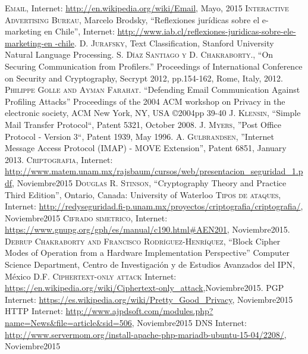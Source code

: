 \documentclass[12pt,oneside,onecolumn,openany]{report}
\begin{document}

\begin{thebibliography}{a}
   \textsc{Email}, Internet: \url{http://en.wikipedia.org/wiki/Email}, Mayo, 2015
   \textsc{Interactive Advertising Bureau}, Marcelo Brodsky, “Reflexiones jurídicas sobre el e-marketing en Chile”, Internet: \url{http://www.iab.cl/reflexiones-juridicas-sobre-ele-marketing-en -chile}.
   \textsc{D. Jurafsky}, Text Classification, Stanford University Natural Language Processing.
   \textsc{S. Díaz Santiago y D. Chakraborty.}, ``On Securing Communication from Profilers.” Proceedings of International Conference on Security and Cryptography, Secrypt 2012, pp.154-162, Rome, Italy, 2012.
   \textsc{Philippe  Golle and Ayman  Farahat}. ``Defending  Email  Communication  Against  Profiling  Attacks'' Proceedings  of  the  2004  ACM  workshop  on  Privacy  in  the  electronic  society, ACM  New  York,  NY, USA ©2004pp 39-40
   \textsc{J. Klensin}, ``Simple Mail Transfer Protocol``, Patent 5321, October 2008. 
   \textsc{J. Myers}, ''Post Office Protocol - Version 3``, Patent 1939, May 1996. 
   \textsc{A.  Gulbrandsen}, ''Internet  Message  Access  Protocol  (IMAP)  -  MOVE  Extension'',  Patent 6851, January 2013. 
   \textsc{Criptografia}, Internet: \url{http://www.matem.unam.mx/rajsbaum/cursos/web/presentacion_seguridad_1.pdf}, Noviembre2015
   \textsc{Douglas R. Stinson}, ``Cryptography Theory and Practice Third Edition'', Ontario, Canada: University of Waterloo
   \textsc{Tipos de ataques}, Internet: \url{http://redyseguridad.fi-p.unam.mx/proyectos/criptografia/criptografia/}, Noviembre2015
   \textsc{Cifrado simetrico}, Internet: \url{https://www.gnupg.org/gph/es/manual/c190.html#AEN201}, Noviembre2015.
   \textsc{Debrup Chakraborty and Francisco Rodríguez-Henríquez}, ``Block Cipher Modes of Operation from a Hardware Implementation Perspective'' Computer Science Department, Centro de Investigación y de Estudios Avanzados del IPN, México D.F. 
   \textsc{Ciphertext-only attack} Internet: \url{https://en.wikipedia.org/wiki/Ciphertext-only_attack},Noviembre2015.
   \textsc{PGP} Internet: \url{https://es.wikipedia.org/wiki/Pretty_Good_Privacy}, Noviembre2015
   \textsc{HTTP} Internet: \url{http://www.ajpdsoft.com/modules.php?name=News&file=article&sid=506}, Noviembre2015
   \textsc{DNS} Internet: \url{http://www.servermom.org/install-apache-php-mariadb-ubuntu-15-04/2208/}, Noviembre2015

\end{thebibliography}
\end{document}
